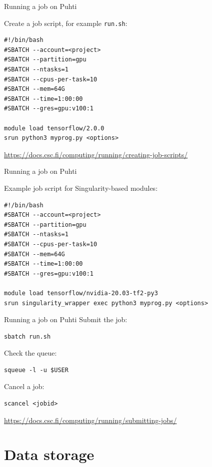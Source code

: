 \documentclass[aspectratio=1610,14pt]{beamer}
\newcommand{\link}[1]{\alert{\url{#1}}}
\begin{document}
\begin{frame}[fragile]{Running a job on Puhti}

  Create a job script, for example {\tt run.sh}:
  
\begin{verbatim}
#!/bin/bash
#SBATCH --account=<project>
#SBATCH --partition=gpu
#SBATCH --ntasks=1
#SBATCH --cpus-per-task=10
#SBATCH --mem=64G
#SBATCH --time=1:00:00
#SBATCH --gres=gpu:v100:1

module load tensorflow/2.0.0
srun python3 myprog.py <options>
\end{verbatim}

{\small \link{https://docs.csc.fi/computing/running/creating-job-scripts/}}
\end{frame}

\begin{frame}[fragile]{Running a job on Puhti}

  Example job script for Singularity-based modules:
  
\begin{verbatim}
#!/bin/bash
#SBATCH --account=<project>
#SBATCH --partition=gpu
#SBATCH --ntasks=1
#SBATCH --cpus-per-task=10
#SBATCH --mem=64G
#SBATCH --time=1:00:00
#SBATCH --gres=gpu:v100:1

module load tensorflow/nvidia-20.03-tf2-py3
srun singularity_wrapper exec python3 myprog.py <options>
\end{verbatim}

\end{frame}

\begin{frame}[fragile]{Running a job on Puhti}
  Submit the job:
\begin{verbatim}
sbatch run.sh
\end{verbatim}
  \vfill
  
  Check the queue:
\begin{verbatim}
squeue -l -u $USER
\end{verbatim}
  \vfill
  
  Cancel a job:
\begin{verbatim}
scancel <jobid>
\end{verbatim}

  {\small \link{https://docs.csc.fi/computing/running/submitting-jobs/}}
\end{frame}

\section{Data storage}
\end{document}
